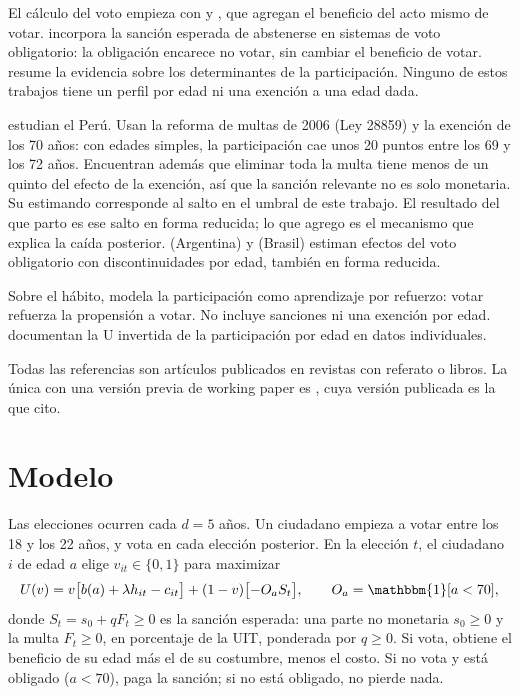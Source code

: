 \documentclass[11pt]{article}
\theoremstyle{definition}
\newcommand{\1}{\mathbbm{1}}
\begin{document}
El cálculo del voto empieza con \citet{downs1957} y \citet{riker1968}, que agregan el beneficio
del acto mismo de votar. \citet{panagopoulos2008} incorpora la sanción esperada de abstenerse en
sistemas de voto obligatorio: la obligación encarece no votar, sin cambiar el beneficio de
votar. \citet{blais2006} resume la evidencia sobre los determinantes de la participación. Ninguno de
estos trabajos tiene un perfil por edad ni una exención a una edad dada.

\citet{gonzales2022} estudian el Perú. Usan la reforma de multas de 2006 (Ley 28859) y la exención
de los 70 años: con edades simples, la participación cae unos 20 puntos entre los 69 y los 72 años.
Encuentran además que eliminar toda la multa tiene menos de un quinto del efecto de la exención, así
que la sanción relevante no es solo monetaria. Su estimando corresponde al salto en el umbral de este
trabajo. El resultado del que parto es ese salto en forma reducida; lo que agrego es el mecanismo que
explica la caída posterior. \citet{jaitman2013} (Argentina) y \citet{cepaluni2016} (Brasil) estiman
efectos del voto obligatorio con discontinuidades por edad, también en forma reducida.

Sobre el hábito, \citet{fowler2006} modela la participación como aprendizaje por refuerzo: votar
refuerza la propensión a votar. No incluye sanciones ni una exención por edad. \citet{bhatti2012}
documentan la U invertida de la participación por edad en datos individuales.

Todas las referencias son artículos publicados en revistas con referato o libros. La única con una
versión previa de working paper es \citet{gonzales2022}, cuya versión publicada es la que cito.

\section{Modelo}\label{sec:model}

Las elecciones ocurren cada $d=5$ años. Un ciudadano empieza a votar entre los 18 y los 22 años, y
vota en cada elección posterior. En la elección $t$, el ciudadano $i$ de edad $a$ elige
$v_{it}\in\{0,1\}$ para maximizar
\begin{equation}\label{eq:problem}
  U(v)=v\bigl[b(a)+\lambda h_{it}-c_{it}\bigr]+(1-v)\bigl[-O_a S_t\bigr],
  \qquad O_a=\1[a<70],
\end{equation}
donde $S_t=s_0+qF_t\ge0$ es la sanción esperada: una parte no monetaria $s_0\ge0$ y la multa
$F_t\ge0$, en porcentaje de la UIT, ponderada por $q\ge0$. Si vota, obtiene el beneficio de su edad
más el de su costumbre, menos el costo. Si no vota y está obligado ($a<70$), paga la sanción; si no
está obligado, no pierde nada.
\end{document}
